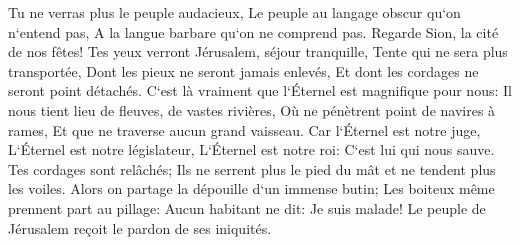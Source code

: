 \verse Tu ne verras plus le peuple audacieux, Le peuple au langage obscur qu`on n`entend pas, A la langue barbare qu`on ne comprend pas. 
\verse Regarde Sion, la cité de nos fêtes! Tes yeux verront Jérusalem, séjour tranquille, Tente qui ne sera plus transportée, Dont les pieux ne seront jamais enlevés, Et dont les cordages ne seront point détachés. 
\verse C`est là vraiment que l`Éternel est magnifique pour nous: Il nous tient lieu de fleuves, de vastes rivières, Où ne pénètrent point de navires à rames, Et que ne traverse aucun grand vaisseau. 
\verse Car l`Éternel est notre juge, L`Éternel est notre législateur, L`Éternel est notre roi: C`est lui qui nous sauve. 
\verse Tes cordages sont relâchés; Ils ne serrent plus le pied du mât et ne tendent plus les voiles. Alors on partage la dépouille d`un immense butin; Les boiteux même prennent part au pillage: 
\verse Aucun habitant ne dit: Je suis malade! Le peuple de Jérusalem reçoit le pardon de ses iniquités. 


